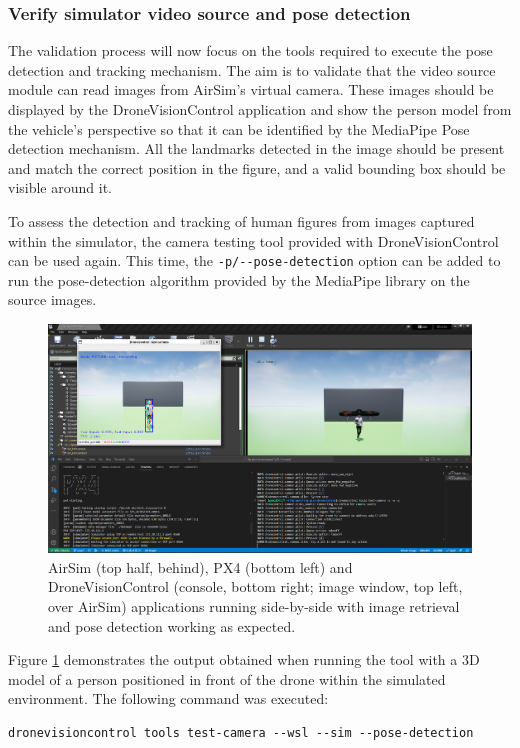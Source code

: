 \subsubsection{Verify simulator video source and pose detection}

The validation process will now focus on the tools required to execute the pose detection and tracking mechanism. The aim is to validate that the video source module can read images from AirSim's virtual camera. These images should be displayed by the DroneVisionControl application and show the person model from the vehicle's perspective so that it can be identified by the MediaPipe Pose detection mechanism. All the landmarks detected in the image should be present and match the correct position in the figure, and a valid bounding box should be visible around it.

To assess the detection and tracking of human figures from images captured within the simulator, the camera testing tool provided with DroneVisionControl can be used again. This time, the \texttt{-p/-{}-pose-detection} option can be added to run the pose-detection algorithm provided by the MediaPipe library on the source images.

\begin{figure}[H]
  \centering
  \includegraphics[width=\textwidth, keepaspectratio]{img/airsim-sitl-pose.png}
  \caption{AirSim (top half, behind), PX4 (bottom left) and DroneVisionControl (console, bottom right; image window, top left, over AirSim) applications running side-by-side with image retrieval and pose detection working as expected.}
  \label{fig:airsim-sitl-pose}
\end{figure}

Figure \ref{fig:airsim-sitl-pose} demonstrates the output obtained when running the tool with a 3D model of a person positioned in front of the drone within the simulated environment. The following command was executed: 
\begin{verbatim}
dronevisioncontrol tools test-camera --wsl --sim --pose-detection
\end{verbatim}


